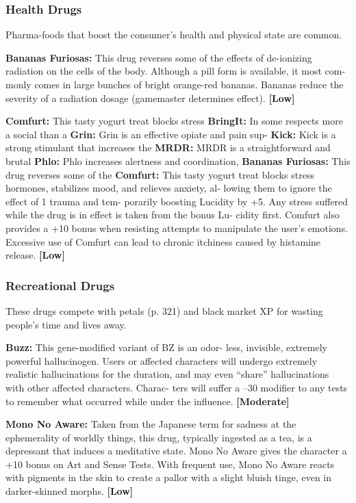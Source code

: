 \subsubsection{Health Drugs}

Pharma-foods that boost the consumer's health and 
physical state are common.

\textbf{Bananas Furiosas:} This drug reverses some of the 
effects of de-ionizing radiation on the cells of the 
body. Although a pill form is available, it most com-
monly comes in large bunches of bright orange-red 
bananas. Bananas reduce the severity of a radiation 
dosage (gamemaster determines effect). \textbf{[Low]}

\textbf{Comfurt:} This tasty yogurt treat blocks stress 
\textbf{BringIt:} In some respects more a social than a 
\textbf{Grin:} Grin is an effective opiate and pain sup-
\textbf{Kick:} Kick is a strong stimulant that increases the 
\textbf{MRDR:  }MRDR is a straightforward and brutal 
\textbf{Phlo:} Phlo increases alertness and coordination, 
\textbf{Bananas Furiosas:} This drug reverses some of the 
\textbf{Comfurt:} This tasty yogurt treat blocks stress 
hormones, stabilizes mood, and relieves anxiety, al-
lowing them to ignore the effect of 1 trauma and tem-
porarily boosting Lucidity by +5. Any stress suffered 
while the drug is in effect is taken from the bonus Lu-
cidity first. Comfurt also provides a +10 bonus when 
resisting attempts to manipulate the user's emotions. 
Excessive use of Comfurt can lead to chronic itchiness 
caused by histamine release. \textbf{[Low]}

\subsubsection{Recreational Drugs}

These drugs compete with petals (p. 321) and black 
market XP for wasting people's time and lives away.

\textbf{Buzz:} This gene-modified variant of BZ is an odor-
less, invisible, extremely powerful hallucinogen. Users 
or affected characters will undergo extremely realistic 
hallucinations for the duration, and may even ``share'' 
hallucinations with other affected characters. Charac-
ters will suffer a –30 modifier to any tests to remember 
what occurred while under the influence. \textbf{[Moderate]}

\textbf{Mono No Aware:} Taken from the Japanese term 
for sadness at the ephemerality of worldly things, this 
drug, typically ingested as a tea, is a depressant that 
induces a meditative state. Mono No Aware gives the 
character a +10 bonus on Art and Sense Tests. With 
frequent use, Mono No Aware reacts with pigments 
in the skin to create a pallor with a slight bluish tinge, 
even in darker-skinned morphs. \textbf{[Low]}

